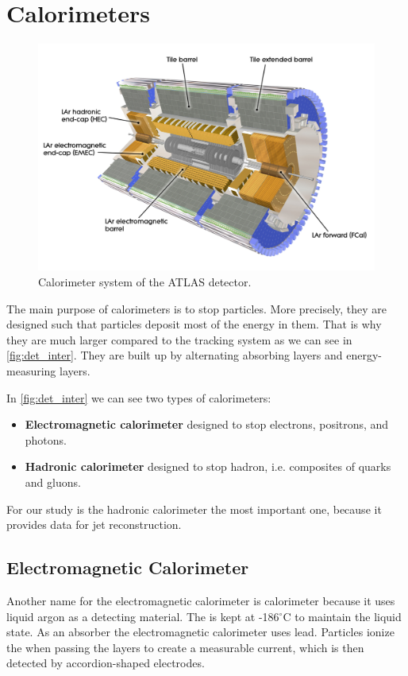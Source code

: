 \section{Calorimeters}
\label{sec:calorimeters}
\begin{figure}[htb]
    \centering
    \includegraphics[width=1\linewidth]{src/img/calo.jpg}
    \caption{Calorimeter system of the ATLAS detector.}
    \label{fig:calorimeter}
\end{figure}

The main purpose of calorimeters is to stop particles. 
More precisely, they are designed such that particles deposit most of the energy in them.
That is why they are much larger compared to the tracking system as we can see in \cref{fig:det_inter}. 
They are built up by alternating absorbing layers and energy-measuring layers. 

In \cref{fig:det_inter} we can see two types of calorimeters:
\begin{itemize}
    \item \textbf{Electromagnetic calorimeter} designed to stop electrons, positrons, and photons.
    \item \textbf{Hadronic calorimeter} designed to stop hadron, i.e. composites of quarks and gluons.
\end{itemize}

For our study is the hadronic calorimeter the most important one, because it provides data for jet reconstruction.


\subsection{Electromagnetic Calorimeter}
Another name for the electromagnetic calorimeter is \LAr calorimeter because it uses liquid argon as a detecting material.
The \LAr is kept at -186$^\circ$C to maintain the liquid state.
As an absorber the electromagnetic calorimeter uses lead.
Particles ionize the \LAr when passing the layers to create a measurable current, which is then detected by accordion-shaped electrodes.

